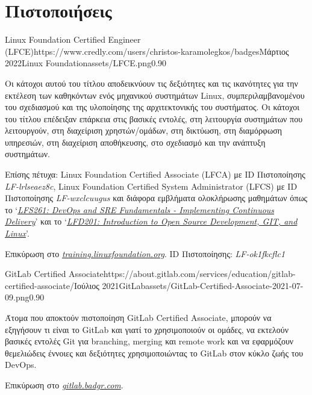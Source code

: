 \documentclass{mycv}
\begin{document}
	\section{Πιστοποιήσεις}
    \begin{EntryDatedLogo}{Linux Foundation Certified Engineer (LFCE)}{https://www.credly.com/users/christos-karamolegkos/badges}{Μάρτιος 2022}{Linux Foundation}{assets/LFCE.png}{0.90}
		\begin{Itemize}
			\item Οι κάτοχοι αυτού του τίτλου αποδεικνύουν τις δεξιότητες και τις ικανότητες για την εκτέλεση των καθηκόντων ενός μηχανικού συστημάτων Linux, συμπεριλαμβανομένου του σχεδιασμού και της υλοποίησης της αρχιτεκτονικής του συστήματος. Οι κάτοχοι του τίτλου επέδειξαν επάρκεια στις βασικές εντολές, στη λειτουργία συστημάτων που λειτουργούν, στη διαχείριση χρηστών/ομάδων, στη δικτύωση, στη διαμόρφωση υπηρεσιών, στη διαχείριση αποθήκευσης, στο σχεδιασμό και την ανάπτυξη συστημάτων.
			\item Επίσης πέτυχα: Linux Foundation Certified Associate (LFCA) με ID Πιστοποίησης \textit{LF-lrlseaez8c}, Linux Foundation Certified System Administrator (LFCS) με ID Πιστοποίησης \textit{LF-wxclcuugus} και διάφορα εμβλήματα ολοκλήρωσης μαθημάτων όπως το `\href{https://www.credly.com/badges/19ff66ca-2e10-4e1b-90a9-1c1ac6132878}{\textit{LFS261: DevOps and SRE Fundamentals - Implementing Continuous Delivery}}' και το `\href{https://www.credly.com/badges/1fc7edfc-227e-4e93-ac46-297ab05c27db}{\textit{LFD201: Introduction to Open Source Development, GIT, and Linux}}'.
		\end{Itemize}
		\vspace{-0.3cm}
		Επικύρωση στο \href{https://training.linuxfoundation.org/certification/verify-linux-certifications}{\textit{training.linuxfoundation.org}}. ID Πιστοποίησης: \textit{LF-ok1fkcflc1}
	\end{EntryDatedLogo}

	\vspace{0.5cm}

    \begin{EntryDatedLogo}{GitLab Certified Associate}{https://about.gitlab.com/services/education/gitlab-certified-associate/}{Ιούλιος 2021}{GitLab}{assets/GitLab-Certified-Associate-2021-07-09.png}{0.90}
		\begin{Itemize}
			\item Άτομα που αποκτούν πιστοποίηση GitLab Certified Associate, μπορούν να εξηγήσουν τι είναι το GitLab και γιατί το χρησιμοποιούν οι ομάδες, να εκτελούν βασικές εντολές Git για branching, merging και remote work και να εφαρμόζουν θεμελιώδεις έννοιες και δεξιότητες χρησιμοποιώντας το GitLab στον κύκλο ζωής του DevOps.
		\end{Itemize}
		\vspace{-0.3cm}
		Επικύρωση στο \href{https://gitlab.badgr.com/public/assertions/Hw6j8Th9SyKNj8ehsQkqAw}{\textit{gitlab.badgr.com}}.
	\end{EntryDatedLogo}
\end{document}
